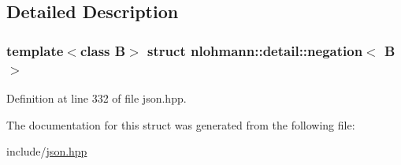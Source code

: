 \subsection{Detailed Description}
\subsubsection*{template$<$class B$>$\newline
struct nlohmann\+::detail\+::negation$<$ B $>$}



Definition at line 332 of file json.\+hpp.



The documentation for this struct was generated from the following file\+:\begin{DoxyCompactItemize}
\item 
include/\hyperlink{json_8hpp}{json.\+hpp}\end{DoxyCompactItemize}
